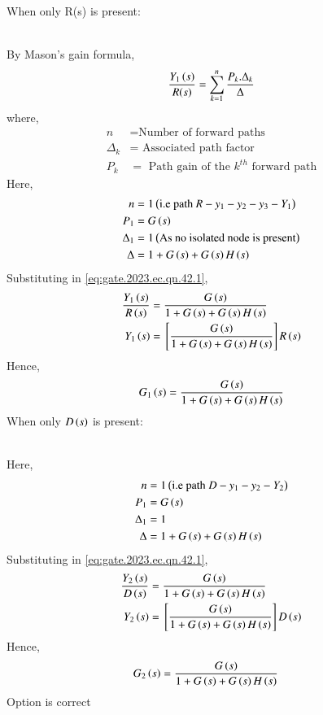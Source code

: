 \documentclass[journal,12pt,onecolumn]{IEEEtran}
\theoremstyle{remark}
\begin{document}
When only R(s) is present:\\
\begin{figure}[ht!]
\centering

\end{figure}\\
By Mason's gain formula, 
\begin{align}
 \frac{Y_1\left(s\right)}{R(s)} = \sum_{k=1}^n \frac{P_k.\Delta{_k}}{\Delta} \label{eq:gate.2023.ec.qn.42.1}
\end{align}
where,\begin{align*}
 n &= \text{Number of forward paths}\\
       \Delta{_k} &= \text{ Associated path factor}\\
       P_k &= \text{ Path gain of the $k^{th}$ forward path}
       \end{align*}
Here, 
\begin{align}
 n&=1\left(\text{i.e path } R-y_1-y_2-y_3-Y_1\right)\\
 P_1&= G\left(s\right)\\
 \Delta{_1}&= 1 \left(\text{As no isolated node is present}\right)\\
 \Delta &= 1+ G\left(s\right) + G\left(s\right)H\left(s\right)
\end{align}
Substituting in \eqref{eq:gate.2023.ec.qn.42.1},
\begin{align}
\frac{Y_1\left(s\right)}{R\left(s\right)} &= \frac{G\left(s\right)}{1+G\left(s\right) + G\left(s\right)H\left(s\right)}\\
Y_1\left(s\right) &= {}\left[\frac{G\left(s\right)}{1+ G\left(s\right)+ G\left(s\right)H\left(s\right)}\right] R\left(s\right)
\end{align}
Hence,
\begin{align}
 G_1\left(s\right) = \frac{G\left(s\right)}{1+G\left(s\right)+G\left(s\right)H\left(s\right)}
\end{align}
When only $D\left(s\right)$ is present:
\begin{figure}[ht!]
\centering

\end{figure}\\
Here, 
\begin{align}
 n&=1\left(\text{i.e path } D-y_1-y_2-Y_2\right)\\
 P_1&= G\left(s\right)\\
 \Delta{_1}&= 1 \\
 \Delta &= 1+ G\left(s\right) + G\left(s\right)H\left(s\right)
\end{align}
Substituting in \eqref{eq:gate.2023.ec.qn.42.1},
\begin{align}
\frac{Y_2\left(s\right)}{D\left(s\right)}&= \frac{G\left(s\right)}{1+ G\left(s\right)+G\left(s\right)H\left(s\right)}\\
Y_2\left(s\right)&= {}\left[\frac{G\left(s\right)}{1+ G\left(s\right)+ G\left(s\right)H\left(s\right)}\right] D\left(s\right)
\end{align}
Hence,
\begin{align}
G_2\left(s\right) &= \frac{G\left(s\right)}{1+ G\left(s\right)+ G\left(s\right)H\left(s\right)}
\end{align}
Option  is correct
\end{document}
